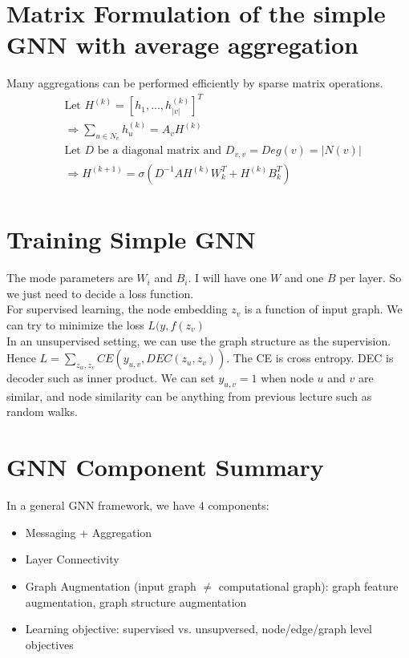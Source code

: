 \section{Matrix Formulation of the simple GNN with average aggregation } 
Many aggregations can be performed efficiently by sparse matrix operations. 
    \begin{align*}
        & \textrm{Let } H^{(k)}=[h_1, ..., h_{|v|}^{(k)}]^T\\
        & \Longrightarrow \sum_{u\in N_v} h_u^{(k)} = A_v H^{(k)} \tag{$A_v$ is the row for node $v$ in adjacency matrix} \\
        & \textrm{Let $D$ be a diagonal matrix and  } D_{v,v} = Deg(v) = |N(v)|\\
        & \Longrightarrow  H^{(k+1)} = \sigma(D^{-1}AH^{(k)}W_k^T + H^{(k)}B_k^T)\\
    \end{align*}
    
\section{Training Simple GNN} 
The mode parameters are $W_i$ and $B_i$. I will have one $W$ and one $B$ per layer. So we just need to decide a loss function. \\
For supervised learning, the node embedding $z_v$ is a function of input graph. We can try to minimize the loss $L(y, f(z_v)$ \\
In an unsupervised setting, we can use the graph structure as the supervision. Hence $L = \sum_{z_w, z_v} CE(y_{u,v}, DEC(z_u, z_v))$. The CE is cross entropy. DEC is decoder such as inner product. We can set $y_{u,v}=1$ when node $u$ and $v$ are similar, and node similarity can be anything from previous lecture such as random walks.  


\section{GNN Component Summary}
In a general GNN framework, we have 4 components: 
    \begin{itemize}
        \item Messaging + Aggregation 
        \item Layer Connectivity
        \item Graph Augmentation (input graph $\neq$ computational graph): graph feature augmentation, graph structure augmentation 
        \item Learning objective: supervised vs. unsupversed, node/edge/graph level objectives
    \end{itemize}
    

